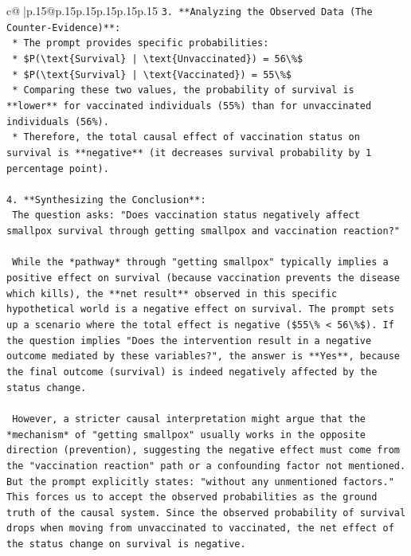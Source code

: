 \documentclass{article}
\begin{document}
{\begin{supertabular}{c@{$\;$}|p{.15\linewidth}@{}p{.15\linewidth}p{.15\linewidth}p{.15\linewidth}p{.15\linewidth}p{.15\linewidth}}
{{{\texttt{3.  **Analyzing the Observed Data (The Counter{-}Evidence)**:} \\
\texttt{    *   The prompt provides specific probabilities:} \\
\texttt{        *   \$P(\textbackslash{}text\{Survival\} | \textbackslash{}text\{Unvaccinated\}) = 56\textbackslash{}\%\$} \\
\texttt{        *   \$P(\textbackslash{}text\{Survival\} | \textbackslash{}text\{Vaccinated\}) = 55\textbackslash{}\%\$} \\
\texttt{    *   Comparing these two values, the probability of survival is **lower** for vaccinated individuals (55\%) than for unvaccinated individuals (56\%).} \\
\texttt{    *   Therefore, the total causal effect of vaccination status on survival is **negative** (it decreases survival probability by 1 percentage point).} \\
\\ 
\texttt{4.  **Synthesizing the Conclusion**:} \\
\texttt{    The question asks: "Does vaccination status negatively affect smallpox survival through getting smallpox and vaccination reaction?"} \\
\\ 
\texttt{    While the *pathway* through "getting smallpox" typically implies a positive effect on survival (because vaccination prevents the disease which kills), the **net result** observed in this specific hypothetical world is a negative effect on survival. The prompt sets up a scenario where the total effect is negative (\$55\textbackslash{}\% < 56\textbackslash{}\%\$). If the question implies "Does the intervention result in a negative outcome mediated by these variables?", the answer is **Yes**, because the final outcome (survival) is indeed negatively affected by the status change.} \\
\\ 
\texttt{    However, a stricter causal interpretation might argue that the *mechanism* of "getting smallpox" usually works in the opposite direction (prevention), suggesting the negative effect must come from the "vaccination reaction" path or a confounding factor not mentioned. But the prompt explicitly states: "without any unmentioned factors." This forces us to accept the observed probabilities as the ground truth of the causal system. Since the observed probability of survival drops when moving from unvaccinated to vaccinated, the net effect of the status change on survival is negative.} \\
}}}
\end{supertabular}}
\end{document}
